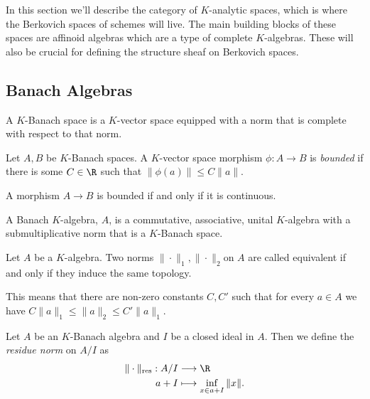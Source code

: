 
In this section we'll describe the category of $K$-analytic spaces, which is where the Berkovich spaces of schemes will live. 
The main building blocks of these spaces are affinoid algebras which are a type of complete $K$-algebras. 
These will also be  crucial for defining the structure sheaf on Berkovich spaces. 

\subsection{Banach Algebras} \label{sec:banach_algebras}
\begin{definition}
	A $K$-Banach space is a $K$-vector space equipped with a norm that is complete with respect to that norm. 
\end{definition}

\begin{definition}
	Let $A, B$ be $K$-Banach spaces. 
	A $K$-vector space morphism $\phi: A \to B$ is \emph{bounded} if there is some $C\in \R$ such that $\|\phi(a)\|\le C \|a\| $. 
\end{definition}

\begin{lemma}
	A morphism $A \to B$ is bounded if and only if it is continuous. 
\end{lemma}

\begin{definition}
	A Banach $K$-algebra, $A$, is a commutative, associative, unital $K$-algebra with a submultiplicative norm that is a $K$-Banach space.
\end{definition}
\begin{definition}
	Let $A$ be a $K$-algebra. 
	Two norms $\|\cdot \|_1, \|\cdot \|_2$on $A$ are called equivalent if and only if they induce the same topology. 

	This means that there are non-zero constants $C, C'$ such that for every $ a\in A$ we have $C\|a\|_1 \le \|a\|_2 \le C'\|a\|_1$. 
\end{definition}

\begin{definition}
	Let $A$ be an $K$-Banach algebra and $I$ be a closed ideal in $A$. 
	Then we define the \emph{residue norm} on $A / I$ as 
	\begin{align*}
		\|\cdot \|_\text{res} : A / I &\longrightarrow \R \\
		a + I &\longmapsto \inf_{x \in a + I} \|x\|
	.\end{align*}
\end{definition}

